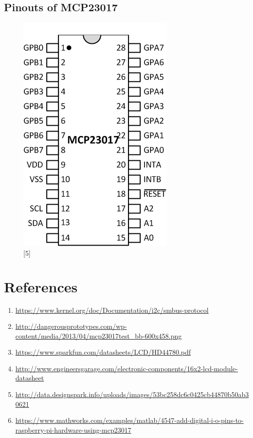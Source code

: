 \documentclass[11pt,a4paper]{article}
\begin{document}
	\subsection{Pinouts of MCP23017}
	\begin{figure}[h!]
		\includegraphics[scale=0.5]{mcp23017.png}
		\centering
		\caption{[5]}
	\end{figure}
			
	\newpage
	\section{References}
	\begin{enumerate}
		\item \url{https://www.kernel.org/doc/Documentation/i2c/smbus-protocol}
		\item \url{http://dangerousprototypes.com/wp-content/media/2013/04/mcp23017test_bb-600x458.png}
		\item \url{https://www.sparkfun.com/datasheets/LCD/HD44780.pdf}
		\item \url{http://www.engineersgarage.com/electronic-components/16x2-lcd-module-datasheet}
		\item \url{http://data.designspark.info/uploads/images/53bc258dc6c0425cb44870b50ab30621}
		\item \url{https://www.mathworks.com/examples/matlab/4547-add-digital-i-o-pins-to-raspberry-pi-hardware-using-mcp23017}
    \end{enumerate}
	
\end{document}
